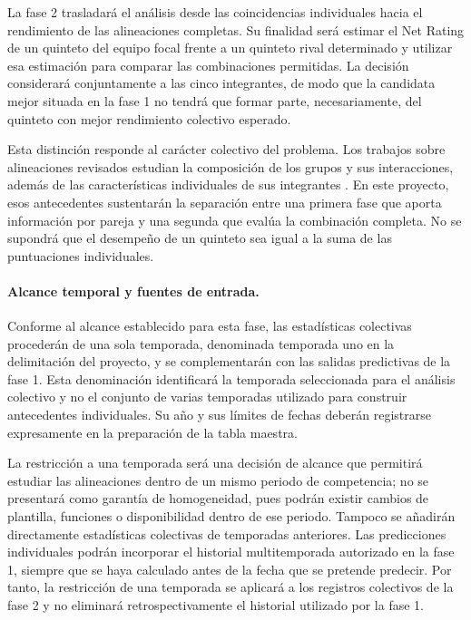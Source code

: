 La fase 2 trasladará el análisis desde las coincidencias individuales hacia el rendimiento de las alineaciones completas. Su finalidad será estimar el Net Rating de un quinteto del equipo focal frente a un quinteto rival determinado y utilizar esa estimación para comparar las combinaciones permitidas. La decisión considerará conjuntamente a las cinco integrantes, de modo que la candidata mejor situada en la fase 1 no tendrá que formar parte, necesariamente, del quinteto con mejor rendimiento colectivo esperado.

Esta distinción responde al carácter colectivo del problema. Los trabajos sobre alineaciones revisados estudian la composición de los grupos y sus interacciones, además de las características individuales de sus integrantes \cite{josephs2025hypergraphadjustedplusminus,yamada2024offensivelineupanalysisbasketball}. En este proyecto, esos antecedentes sustentarán la separación entre una primera fase que aporta información por pareja y una segunda que evalúa la combinación completa. No se supondrá que el desempeño de un quinteto sea igual a la suma de las puntuaciones individuales.

\paragraph*{Alcance temporal y fuentes de entrada.}
Conforme al alcance establecido para esta fase, las estadísticas colectivas procederán de una sola temporada, denominada temporada uno en la delimitación del proyecto, y se complementarán con las salidas predictivas de la fase 1. Esta denominación identificará la temporada seleccionada para el análisis colectivo y no el conjunto de varias temporadas utilizado para construir antecedentes individuales. Su año y sus límites de fechas deberán registrarse expresamente en la preparación de la tabla maestra.

La restricción a una temporada será una decisión de alcance que permitirá estudiar las alineaciones dentro de un mismo periodo de competencia; no se presentará como garantía de homogeneidad, pues podrán existir cambios de plantilla, funciones o disponibilidad dentro de ese periodo. Tampoco se añadirán directamente estadísticas colectivas de temporadas anteriores. Las predicciones individuales podrán incorporar el historial multitemporada autorizado en la fase 1, siempre que se haya calculado antes de la fecha que se pretende predecir. Por tanto, la restricción de una temporada se aplicará a los registros colectivos de la fase 2 y no eliminará retrospectivamente el historial utilizado por la fase 1.

